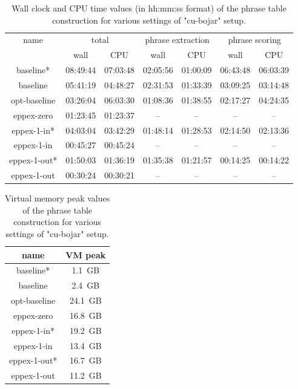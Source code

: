 \begin{table}[ht]
\centering
\begin{tabular}{ | c | c c | c c | c c | }
\hline
name & \multicolumn{2}{|c|}{total} & \multicolumn{2}{|c|}{phrase extraction} & \multicolumn{2}{|c|}{phrase scoring} \\
 & wall & CPU & wall & CPU & wall & CPU \\
\hline
\hline
baseline*    & 08:49:44 & 07:03:48 & 02:05:56 & 01:00:09 & 06:43:48 & 06:03:39 \\
baseline     & 05:41:19 & 04:48:27 & 02:31:53 & 01:33:39 & 03:09:25 & 03:14:48 \\
opt-baseline & 03:26:04 & 06:03:30 & 01:08:36 & 01:38:55 & 02:17:27 & 04:24:35 \\
eppex-zero   & 01:23:45 & 01:23:37 & -- & -- & -- & -- \\
\hline
eppex-1-in*  & 04:03:04 & 03:42:29 & 01:48:14 & 01:28:53 & 02:14:50 & 02:13:36 \\
eppex-1-in   & 00:45:27 & 00:45:24 & -- & -- & -- & -- \\
\hline
eppex-1-out* & 01:50:03 & 01:36:19 & 01:35:38 & 01:21:57 & 00:14:25 & 00:14:22 \\
eppex-1-out  & 00:30:24 & 00:30:21 & -- & -- & -- & -- \\
\hline
\end{tabular}
\caption{\label{cu-bojar-time-benchmarks}Wall clock and CPU time values (in hh:mm:ss format)
of the phrase table construction for various settings of "cu-bojar" setup.}
\end{table}

\begin{table}[ht]
\centering
\begin{tabular}{ | c | c | }
\hline
name & VM peak \\
\hline
\hline
baseline*    & 1.1~GB \\
baseline     & 2.4~GB \\ %
opt-baseline & 24.1~GB \\
eppex-zero   & 16.8~GB \\
\hline
eppex-1-in*  & 19.2~GB \\
eppex-1-in   & 13.4~GB \\
\hline
eppex-1-out* & 16.7~GB \\
eppex-1-out  & 11.2~GB \\
\hline
\end{tabular}
\caption{\label{cu-bojar-vm-peak-benchmarks}Virtual memory peak values
of the phrase table construction for various settings of "cu-bojar" setup.}
\end{table}
